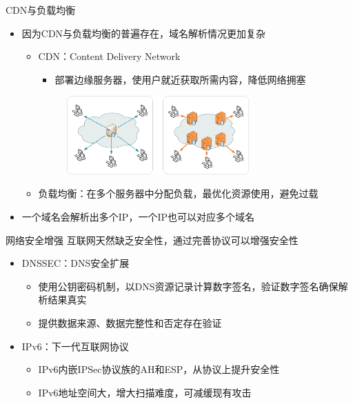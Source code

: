 \documentclass{beamer}
\begin{document}
\begin{frame}{CDN与负载均衡}
  
  \begin{itemize}
    \item 因为CDN与负载均衡的普遍存在，域名解析情况更加复杂
    \begin{itemize}
    \item CDN：Content Delivery Network
    \begin{itemize}
      \item 部署边缘服务器，使用户就近获取所需内容，降低网络拥塞
    \end{itemize}
    \begin{figure}
    \includegraphics[height=3cm,width=7.07cm]{images/NCDNCDN.png}
    \end{figure}
    
    \item 负载均衡：在多个服务器中分配负载，最优化资源使用，避免过载
    \end{itemize}
    \item 一个域名会解析出多个IP，一个IP也可以对应多个域名
  \end{itemize}
  


\end{frame}

\begin{frame}{网络安全增强}
  互联网天然缺乏安全性，通过完善协议可以增强安全性
  \begin{itemize}

    \item DNSSEC：DNS安全扩展
    \begin{itemize}
      \item 使用公钥密码机制，以DNS资源记录计算数字签名，验证数字签名确保解析结果真实
      \item 提供数据来源、数据完整性和否定存在验证
    \end{itemize}
    \item IPv6：下一代互联网协议
    \begin{itemize}
      \item IPv6内嵌IPSec协议族的AH和ESP，从协议上提升安全性
      \item IPv6地址空间大，增大扫描难度，可减缓现有攻击
    \end{itemize}
    
  

  \end{itemize}
  

  
\end{frame}
\end{document}

